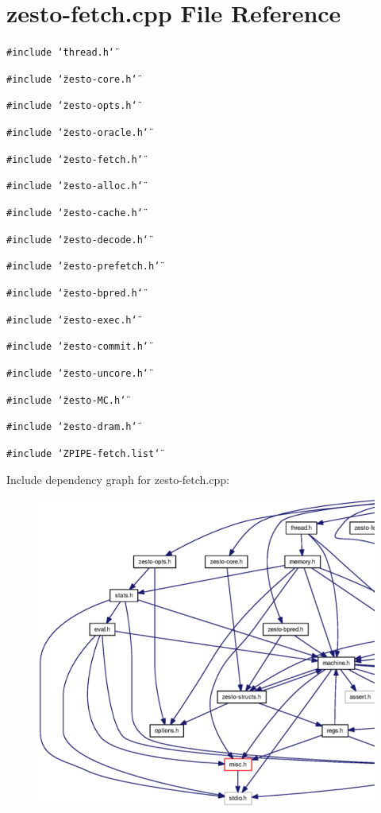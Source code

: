 \section{zesto-fetch.cpp File Reference}
\label{zesto-fetch_8cpp}
{\tt \#include \char`\"{}thread.h\char`\"{}}\par
{\tt \#include \char`\"{}zesto-core.h\char`\"{}}\par
{\tt \#include \char`\"{}zesto-opts.h\char`\"{}}\par
{\tt \#include \char`\"{}zesto-oracle.h\char`\"{}}\par
{\tt \#include \char`\"{}zesto-fetch.h\char`\"{}}\par
{\tt \#include \char`\"{}zesto-alloc.h\char`\"{}}\par
{\tt \#include \char`\"{}zesto-cache.h\char`\"{}}\par
{\tt \#include \char`\"{}zesto-decode.h\char`\"{}}\par
{\tt \#include \char`\"{}zesto-prefetch.h\char`\"{}}\par
{\tt \#include \char`\"{}zesto-bpred.h\char`\"{}}\par
{\tt \#include \char`\"{}zesto-exec.h\char`\"{}}\par
{\tt \#include \char`\"{}zesto-commit.h\char`\"{}}\par
{\tt \#include \char`\"{}zesto-uncore.h\char`\"{}}\par
{\tt \#include \char`\"{}zesto-MC.h\char`\"{}}\par
{\tt \#include \char`\"{}zesto-dram.h\char`\"{}}\par
{\tt \#include \char`\"{}ZPIPE-fetch.list\char`\"{}}\par


Include dependency graph for zesto-fetch.cpp:\nopagebreak
\begin{figure}[H]
\begin{center}
\leavevmode
\includegraphics[width=420pt]{zesto-fetch_8cpp__incl}
\end{center}
\end{figure}
